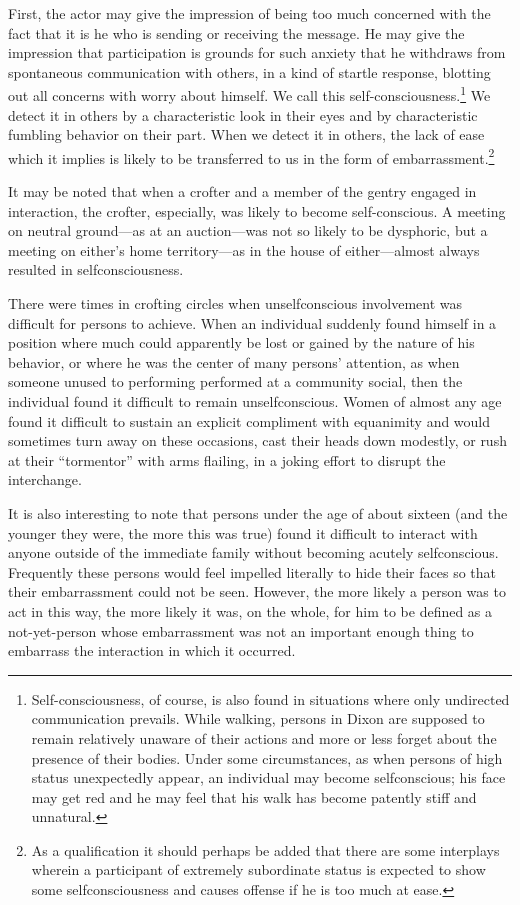 \documentclass[twoside,symmetric,nobib,justified]{tufte-book}
\begin{document}
First, the actor may give the impression of being too much concerned
with the fact that it is he who is sending or receiving the message. He
may give the impression that participation is grounds for such anxiety
that he withdraws from spontaneous communication with others, in a kind
of startle response, blotting out all concerns with worry about himself.
We call this self-consciousness.\footnote{Self-consciousness, of course,
  is also found in situations where only undirected communication
  prevails. While walking, persons in Dixon are supposed to remain
  relatively unaware of their actions and more or less forget about the
  presence of their bodies. Under some circumstances, as when persons of
  high status unexpectedly appear, an individual may become
  selfconscious; his face may get red and he may feel that his walk has
  become patently stiff and unnatural.} We detect it in others by a
characteristic look in their eyes and by characteristic fumbling
behavior on their part. When we detect it in others, the lack of ease
which it implies is likely to be transferred to us in the form of
embarrassment.\footnote{As a qualification it should perhaps be added
  that there are some interplays wherein a participant of extremely
  subordinate status is expected to show some selfconsciousness and
  causes offense if he is too much at ease.}

It may be noted that when a crofter and a member of the gentry engaged
in interaction, the crofter, especially, was likely to become
self-conscious. A meeting on neutral ground---as at an auction---was not
so likely to be dysphoric, but a meeting on either's home territory---as
in the house of either---almost always resulted in selfconsciousness.

There were times in crofting circles when unselfconscious involvement
was difficult for persons to achieve. When an individual suddenly found
himself in a position where much could apparently be lost or gained by
the nature of his behavior, or where he was the center of many persons'
attention, as when someone unused to performing performed at a community
social, then the individual found it difficult to remain
unselfconscious. Women of almost any age found it difficult to sustain
an explicit compliment with equanimity and would sometimes turn away on
these occasions, cast their heads down modestly, or rush at their
``tormentor'' with arms flailing, in a joking effort to disrupt the
interchange.

It is also interesting to note that persons under the age of about
sixteen (and the younger they were, the more this was true) found it
difficult to interact with anyone outside of the immediate family
without becoming acutely selfconscious. Frequently these persons would
feel impelled literally to hide their faces so that their embarrassment
could not be seen. However, the more likely a person was to act in this
way, the more likely it was, on the whole, for him to be defined as a
not-yet-person whose embarrassment was not an important enough thing to
embarrass the interaction in which it occurred.
\end{document}
